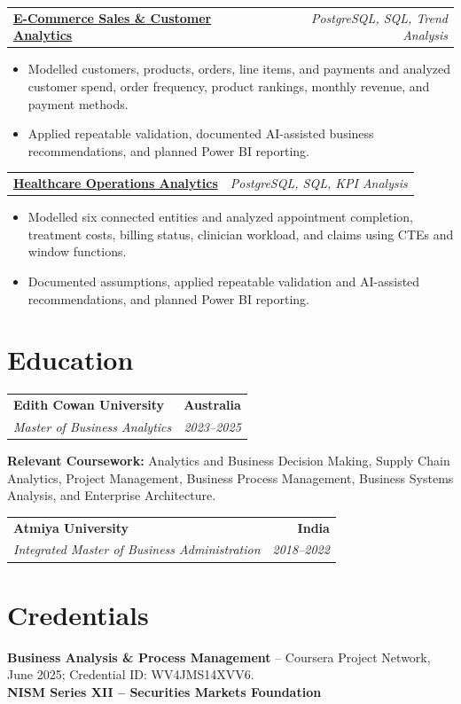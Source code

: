 \documentclass[letterpaper,10pt]{article}
\makeatletter
\newcommand{\role}[4]{%
  \begin{tabularx}{\textwidth}{@{}Xr@{}}
    \textbf{#1} & \textbf{#2} \\
    \textit{#3} & \textit{#4}
  \end{tabularx}\vspace{-1pt}
}
\newcommand{\project}[2]{%
  \begin{tabularx}{\textwidth}{@{}Xr@{}}
    \textbf{#1} & \textit{#2}
  \end{tabularx}\vspace{-1pt}
}
\makeatother
\begin{document}
\project{\href{https://github.com/jainalimehta/Ecommerce-Sales-Analytics}{E-Commerce Sales \& Customer Analytics}}{PostgreSQL, SQL, Trend Analysis}
\begin{itemize}
  \item Modelled customers, products, orders, line items, and payments and analyzed customer spend, order frequency, product rankings, monthly revenue, and payment methods.
  \item Applied repeatable validation, documented AI-assisted business recommendations, and planned Power BI reporting.
\end{itemize}
\vspace{1pt}

\project{\href{https://github.com/jainalimehta/Healthcare-Analytics}{Healthcare Operations Analytics}}{PostgreSQL, SQL, KPI Analysis}
\begin{itemize}
  \item Modelled six connected entities and analyzed appointment completion, treatment costs, billing status, clinician workload, and claims using CTEs and window functions.
  \item Documented assumptions, applied repeatable validation and AI-assisted recommendations, and planned Power BI reporting.
\end{itemize}

\section{Education}
\role{Edith Cowan University}{Australia}{Master of Business Analytics}{2023--2025}
\small\textbf{Relevant Coursework:} Analytics and Business Decision Making, Supply Chain Analytics, Project Management, Business Process Management, Business Systems Analysis, and Enterprise Architecture.\\[2pt]
\role{Atmiya University}{India}{Integrated Master of Business Administration}{2018--2022}

\section{Credentials}
\small\textbf{Business Analysis \& Process Management} -- Coursera Project Network, June 2025; Credential ID: WV4JMS14XVV6.\\[-0.2pt]
\small\textbf{NISM Series XII -- Securities Markets Foundation}
\end{document}
